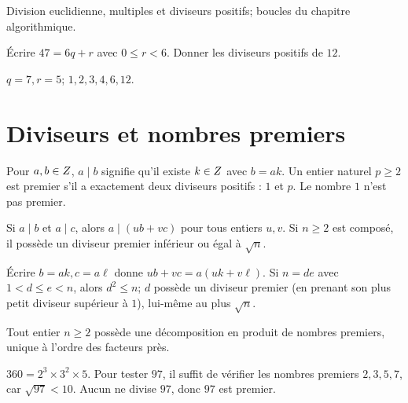 \label{t11s-c10}
\begin{revision}Division euclidienne, multiples et diviseurs positifs; boucles du chapitre algorithmique.\end{revision}
\begin{automatismes}\exo\label{t11s-c10-auto}Écrire $47=6q+r$ avec $0\le r<6$. Donner les diviseurs positifs de $12$.\end{automatismes}
\begin{corrige}\label{sol-t11s-c10-auto}$q=7,r=5$; $1,2,3,4,6,12$.\end{corrige}

\section{Diviseurs et nombres premiers}
\begin{definition}Pour $a,b\in Z$, $a\mid b$ signifie qu’il existe $k\in Z$ avec $b=ak$. Un entier naturel $p\ge2$ est premier s’il a exactement deux diviseurs positifs : $1$ et $p$. Le nombre $1$ n’est pas premier.\end{definition}
\begin{propriete}Si $a\mid b$ et $a\mid c$, alors $a\mid (ub+vc)$ pour tous entiers $u,v$. Si $n\ge2$ est composé, il possède un diviseur premier inférieur ou égal à $\sqrt n$.\end{propriete}
\begin{demonstration}Écrire $b=ak,c=a\ell$ donne $ub+vc=a(uk+v\ell)$. Si $n=de$ avec $1<d\le e<n$, alors $d^2\le n$; $d$ possède un diviseur premier (en prenant son plus petit diviseur supérieur à $1$), lui-même au plus $\sqrt n$.\end{demonstration}
\begin{theoreme}Tout entier $n\ge2$ possède une décomposition en produit de nombres premiers, unique à l’ordre des facteurs près.\end{theoreme}
\begin{exemple}$360=2^3\times3^2\times5$. Pour tester $97$, il suffit de vérifier les nombres premiers $2,3,5,7$, car $\sqrt{97}<10$. Aucun ne divise $97$, donc $97$ est premier.\end{exemple}
